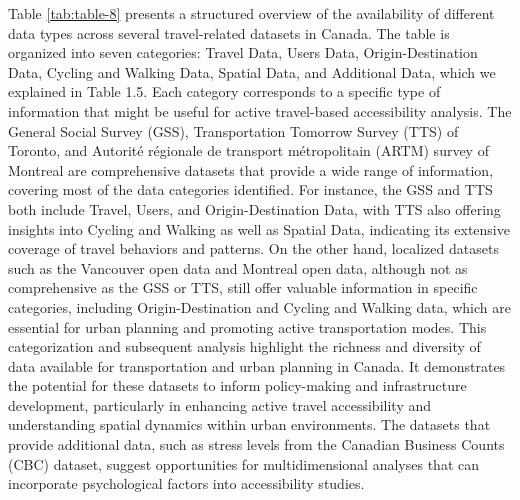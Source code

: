 \documentclass[
11pt, %
oneside, %
english, %
singlespacing, %
]{macthesis} %
\begin{document}
\newpage

Table \ref{tab:table-8} presents a structured overview of the availability of different data types across several travel-related datasets in Canada. The table is organized into seven categories: Travel Data, Users Data, Origin-Destination Data, Cycling and Walking Data, Spatial Data, and Additional Data, which we explained in Table 1.5. Each category corresponds to a specific type of information that might be useful for active travel-based accessibility analysis.
The General Social Survey (GSS), Transportation Tomorrow Survey (TTS) of Toronto, and Autorité régionale de transport métropolitain (ARTM) survey of Montreal are comprehensive datasets that provide a wide range of information, covering most of the data categories identified. For instance, the GSS and TTS both include Travel, Users, and Origin-Destination Data, with TTS also offering insights into Cycling and Walking as well as Spatial Data, indicating its extensive coverage of travel behaviors and patterns.
On the other hand, localized datasets such as the Vancouver open data and Montreal open data, although not as comprehensive as the GSS or TTS, still offer valuable information in specific categories, including Origin-Destination and Cycling and Walking data, which are essential for urban planning and promoting active transportation modes.
This categorization and subsequent analysis highlight the richness and diversity of data available for transportation and urban planning in Canada. It demonstrates the potential for these datasets to inform policy-making and infrastructure development, particularly in enhancing active travel accessibility and understanding spatial dynamics within urban environments. The datasets that provide additional data, such as stress levels from the Canadian Business Counts (CBC) dataset, suggest opportunities for multidimensional analyses that can incorporate psychological factors into accessibility studies.
\end{document}
